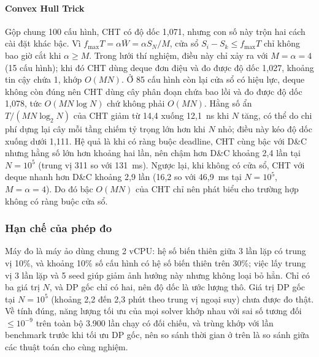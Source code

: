 \paragraph{Convex Hull Trick}
Gộp chung 100 cấu hình, CHT có độ dốc 1{,}071, nhưng con số này trộn hai cách cài đặt khác bậc.
Vì $f_{\max} T = \alpha \bar W = \alpha S_N / M$, cửa sổ $S_i - S_k \le f_{\max} T$ chỉ không bao giờ cắt khi $\alpha \ge M$.
Trong lưới thí nghiệm, điều này chỉ xảy ra với $M = \alpha = 4$ (15 cấu hình); khi đó CHT dùng deque đơn điệu
và đo được độ dốc 1{,}027, khoảng tin cậy chứa 1, khớp $O(MN)$.
Ở 85 cấu hình còn lại cửa sổ có hiệu lực, deque không còn đúng nên CHT dùng cây phân đoạn chứa bao lồi
và đo được độ dốc 1{,}078, tức $O(MN\log N)$ chứ không phải $O(MN)$.
Hằng số ẩn $T / (MN\log_2 N)$ của CHT giảm từ 14{,}4 xuống 12{,}1~ns khi $N$ tăng, có thể do chi phí dựng lại cây
mỗi tầng chiếm tỷ trọng lớn hơn khi $N$ nhỏ; điều này kéo độ dốc xuống dưới 1{,}111.
Hệ quả là khi có ràng buộc deadline, CHT cùng bậc với D\&C nhưng hằng số lớn hơn khoảng hai lần,
nên chậm hơn D\&C khoảng 2{,}4 lần tại $N = 10^5$ (trung vị 311 so với 131~ms).
Ngược lại, khi không có cửa sổ, CHT với deque nhanh hơn D\&C khoảng 2{,}9 lần (16{,}2 so với 46{,}9~ms tại $N = 10^5$, $M = \alpha = 4$).
Do đó bậc $O(MN)$ của CHT chỉ nên phát biểu cho trường hợp không có ràng buộc cửa sổ.

\subsubsection{Hạn chế của phép đo}
Máy đo là máy ảo dùng chung 2 vCPU: hệ số biến thiên giữa 3 lần lặp có trung vị 10\%, và khoảng 10\% số cấu hình
có hệ số biến thiên trên 30\%; việc lấy trung vị 3 lần lặp và 5 seed giúp giảm ảnh hưởng này nhưng không loại bỏ hẳn.
Chỉ có ba giá trị $N$, và DP gốc chỉ có hai, nên độ dốc là ước lượng thô.
Giá trị DP gốc tại $N = 10^5$ (khoảng 2{,}2 đến 2{,}3 phút theo trung vị ngoại suy) chưa được đo thật.
Về tính đúng, năng lượng tối ưu của mọi solver khớp nhau với sai số tương đối $\le 10^{-9}$
trên toàn bộ 3.900 lần chạy có đối chiếu, và trùng khớp với lần benchmark trước khi tối ưu DP gốc,
nên so sánh thời gian ở trên là so sánh giữa các thuật toán cho cùng nghiệm.
